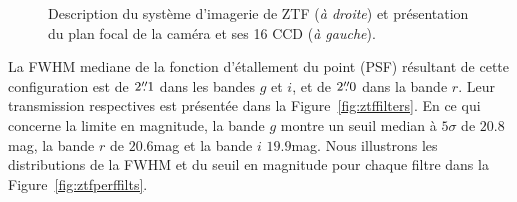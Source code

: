 \documentclass[../main/main.tex]{subfiles}
\begin{document}
\begin{figure}[ht]
\centering
{}\hfill
{}
\caption[Système d'imagerie ZTF et caméra]{Description du système d'imagerie de ZTF (\textit{à droite}) et présentation du
  plan focal de la caméra et ses 16 CCD (\textit{à gauche}). }
\label{fig:imageriecamztf}
\end{figure}


La FWHM mediane de la fonction d'étallement du point
(PSF) résultant de cette configuration est de $2\overset{\prime\prime}{.}1$ dans les bandes
$g$ et $i$, et de $2\overset{\prime\prime}{.}0$ dans la bande $r$. Leur transmission
respectives est présentée dans la Figure~\ref{fig:ztffilters}. En ce qui concerne la limite en magnitude, la bande $g$ montre un seuil median à
$5\sigma$ de $20.8$mag, la bande $r$ de $20.6$mag et la bande $i$
$19.9$mag. Nous illustrons les distributions de la FWHM et du seuil en
magnitude pour chaque filtre dans la Figure~\ref{fig:ztfperffilts}. 
\end{document}
